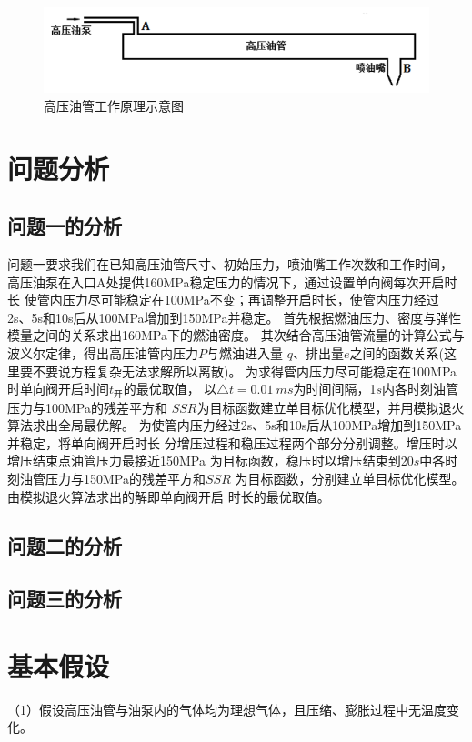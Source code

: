 \documentclass[withoutpreface,bwprint]{cumcmthesis} %
\begin{document}
\begin{figure}[!h]
    \centering
    \includegraphics[width=.8\textwidth]{figure1.png}
    \caption{高压油管工作原理示意图}
    \label{figure1}
\end{figure}

\section{问题分析}
\subsection{问题一的分析}   
    问题一要求我们在已知高压油管尺寸、初始压力，喷油嘴工作次数和工作时间，
    高压油泵在入口A处提供160MPa稳定压力的情况下，通过设置单向阀每次开启时长
    使管内压力尽可能稳定在100MPa不变；再调整开启时长，使管内压力经过
    2s、5s和10s后从100MPa增加到150MPa并稳定。
    首先根据燃油压力、密度与弹性模量之间的关系求出160MPa下的燃油密度。
    其次结合高压油管流量的计算公式与波义尔定律，得出高压油管内压力$P$与燃油进入量
    $q$、排出量$e$之间的函数关系({\color{red}这里要不要说方程复杂无法求解所以离散})。
    为求得管内压力尽可能稳定在100MPa时单向阀开启时间$t_{\text{开}}$的最优取值，
    以$\triangle t=0.01~ms$为时间间隔，1$s$内各时刻油管压力与100MPa的残差平方和
    $SSR$为目标函数建立单目标优化模型，并用模拟退火算法求出全局最优解。
    为使管内压力经过2s、5s和10s后从100MPa增加到150MPa并稳定，将单向阀开启时长
    分增压过程和稳压过程两个部分分别调整。增压时以增压结束点油管压力最接近150MPa
    为目标函数，稳压时以增压结束到20$s$中各时刻油管压力与150MPa的残差平方和$SSR$
    为目标函数，分别建立单目标优化模型。由模拟退火算法求出的解即单向阀开启
    时长的最优取值。

\subsection{问题二的分析}
        

\subsection{问题三的分析}
        
     

\section{基本假设}
（1）假设高压油管与油泵内的气体均为理想气体，且压缩、膨胀过程中无温度变化。
\end{document}
